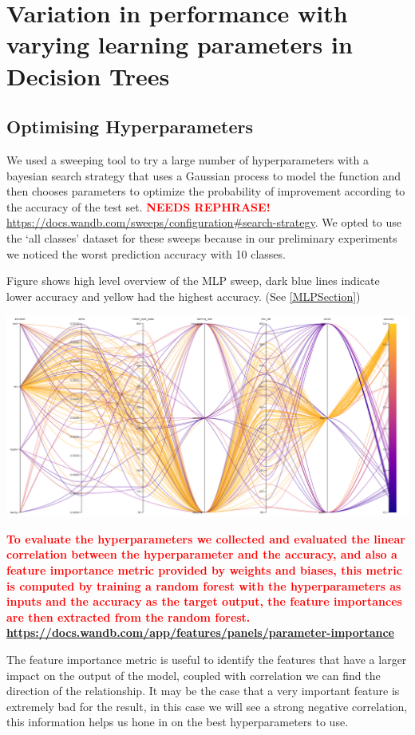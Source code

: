 \documentclass[11pt]{article}
\begin{document}
\newpage
\section{Variation in performance with varying learning parameters in Decision Trees}
\subsection{Optimising Hyperparameters}
We used a sweeping tool to try a large number of hyperparameters with a bayesian search strategy that uses a Gaussian process to model the function and then chooses parameters to optimize the probability of improvement according to the accuracy of the test set. \textcolor{red}{\textbf{NEEDS REPHRASE!}} 
\url{https://docs.wandb.com/sweeps/configuration#search-strategy}.
We opted to use the ‘all classes’ dataset for these sweeps because in our preliminary experiments we noticed the worst prediction accuracy with 10 classes.

Figure shows high level overview of the MLP sweep, dark blue lines indicate lower accuracy and yellow had the highest accuracy. (See \ref{MLPSection})

\begin{center}
  \includegraphics [width = \textwidth, height = 0.3\textheight, keepaspectratio]{Images/MLP ParallelCoordGraph.png}
\end{center}

\textcolor{red}{\textbf{To evaluate the hyperparameters we collected and evaluated the linear correlation between the hyperparameter and the accuracy, and also a feature importance metric provided by weights and biases, this metric is computed by training a random forest with the hyperparameters as inputs and the accuracy as the target output, the feature importances are then extracted from the random forest. \url{https://docs.wandb.com/app/features/panels/parameter-importance}
}}
\par
The feature importance metric is useful to identify the features that have a larger impact on the output of the model, coupled with correlation we can find the direction of the relationship. It may be the case that a very important feature is extremely bad for the result, in this case we will see a strong negative correlation, this information helps us hone in on the best hyperparameters to use.
\end{document}
